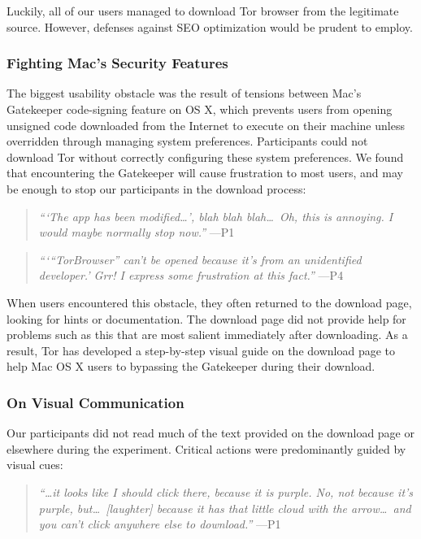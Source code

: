 \documentclass[letterpaper,twocolumn,11pt]{article}
\begin{document}
Luckily, all of our users managed to download Tor browser from the legitimate source. However, 
defenses against SEO optimization would be prudent to employ. 

\subsubsection{Fighting Mac's Security Features}
The biggest usability obstacle was the result of tensions between Mac's Gatekeeper 
code-signing feature on OS X, which prevents users from opening unsigned code 
downloaded from the Internet to execute on their machine unless overridden through
managing system preferences. Participants could not download Tor without correctly
configuring these system preferences. We found that 
encountering the Gatekeeper will cause frustration to most users, and may be enough 
to stop our participants in the download process: 

\begin{quote}{\it
``\/`The app has been modified\ldots', blah blah blah\ldots\  Oh, this is annoying. I would maybe normally stop now.''} \mbox{---P1}
\end{quote}

\begin{quote}{\it
``\/`\/``TorBrowser'' can't be opened because it's from an unidentified developer.'
Grr! I express some frustration at this fact.''} \mbox{---P4}
\end{quote}

When users encountered this obstacle,
they often returned to the download page, looking for hints or documentation.
The download page did not provide help for problems such as this
that are most salient immediately after downloading.
As a result, Tor has developed a step-by-step visual guide on the download page to 
help Mac OS X users to bypassing the Gatekeeper during their download. 

\subsubsection{On Visual Communication}
Our participants did not read much of the text provided on the download page or elsewhere during 
the experiment. Critical actions were predominantly guided by visual cues:

\begin{quote}{\it
``\ldots it looks like I should click there, because it is purple. No, not because it's purple, but\ldots\ 
[laughter] because it has that little cloud with the arrow\ldots\ and you can't click anywhere else to download.''} \mbox{---P1} 
\end{quote}
\end{document}
